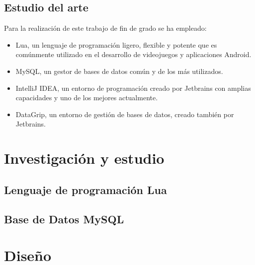     \newpage


    \section{Estudio del arte}
    
    Para la realización de este trabajo de fin de grado se ha empleado:
    
    \begin{itemize}
        \item Lua, un lenguaje de programación ligero, flexible y potente que es comúnmente utilizado en el desarrollo de videojuegos y aplicaciones Android.
        \item MySQL, un gestor de bases de datos común y de los más utilizados.
        \item IntelliJ IDEA, un entorno de programación creado por Jetbrains con amplias capacidades y uno de los mejores actualmente.
        \item DataGrip, un entorno de gestión de bases de datos, creado también por Jetbrains.
    \end{itemize}

\cleardoublepage



\chapter{Investigación y estudio}

    \section{Lenguaje de programación Lua}



    \section{Base de Datos MySQL}

\cleardoublepage



\chapter{Diseño}

\cleardoublepage



